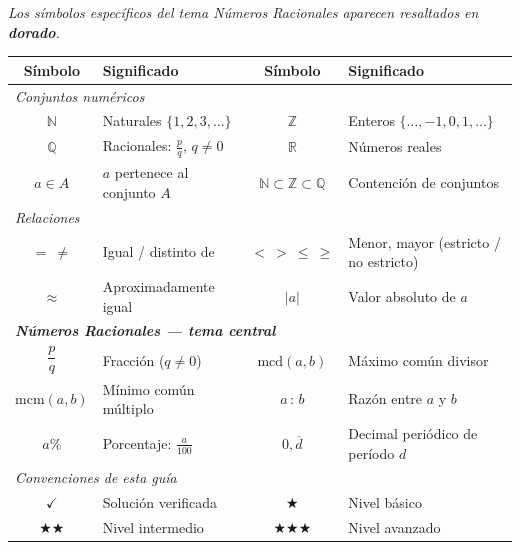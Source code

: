 \documentclass[11pt, letterpaper]{article}
\begin{document}
\begin{tcolorbox}[importantbox, title={Glosario de simbolog\'ia}]

{\small\textit{Los s\'imbolos espec\'ificos del tema N\'umeros Racionales aparecen resaltados en \textcolor{zenitgold}{\textbf{dorado}}.}}

\medskip

\begin{center}
\renewcommand{\arraystretch}{1.32}
\begin{tabular}{c p{4.8cm} | c p{4.8cm}}
\toprule
\textbf{S\'imbolo} & \textbf{Significado} & \textbf{S\'imbolo} & \textbf{Significado}\\
\midrule
\multicolumn{4}{l}{\textit{Conjuntos num\'ericos}}\\
$\mathbb{N}$ & Naturales $\{1,2,3,\ldots\}$ &
$\mathbb{Z}$ & Enteros $\{\ldots,-1,0,1,\ldots\}$\\
$\mathbb{Q}$ & Racionales: $\frac{p}{q}$, $q\neq 0$ &
$\mathbb{R}$ & N\'umeros reales\\
$a \in A$ & $a$ pertenece al conjunto $A$ &
$\mathbb{N}\subset\mathbb{Z}\subset\mathbb{Q}$ & Contenci\'on de conjuntos\\[3pt]
\multicolumn{4}{l}{\textit{Relaciones}}\\
$=\ \neq$ & Igual / distinto de &
$<\ >\ \leq\ \geq$ & Menor, mayor (estricto / no estricto)\\
$\approx$ & Aproximadamente igual &
$|a|$ & Valor absoluto de $a$\\[3pt]
\multicolumn{4}{l}{\textit{\textcolor{zenitgold}{\textbf{N\'umeros Racionales --- tema central}}}}\\
\textcolor{zenitgold}{$\dfrac{p}{q}$} & \textcolor{zenitgold}{Fracci\'on ($q\neq 0$)} &
\textcolor{zenitgold}{$\text{mcd}(a,b)$} & \textcolor{zenitgold}{M\'aximo com\'un divisor}\\[6pt]
\textcolor{zenitgold}{$\text{mcm}(a,b)$} & \textcolor{zenitgold}{M\'inimo com\'un m\'ultiplo} &
\textcolor{zenitgold}{$a\,{:}\,b$} & \textcolor{zenitgold}{Raz\'on entre $a$ y $b$}\\[3pt]
\textcolor{zenitgold}{$a\%$} & \textcolor{zenitgold}{Porcentaje: $\frac{a}{100}$} &
\textcolor{zenitgold}{$0{,}\overline{d}$} & \textcolor{zenitgold}{Decimal peri\'odico de per\'iodo $d$}\\[3pt]
\multicolumn{4}{l}{\textit{Convenciones de esta gu\'ia}}\\
$\checkmark$ & Soluci\'on verificada &
$\bigstar$ & Nivel b\'asico\\
$\bigstar\bigstar$ & Nivel intermedio &
$\bigstar\bigstar\bigstar$ & Nivel avanzado\\
\bottomrule
\end{tabular}
\end{center}
\end{tcolorbox}
\end{document}
